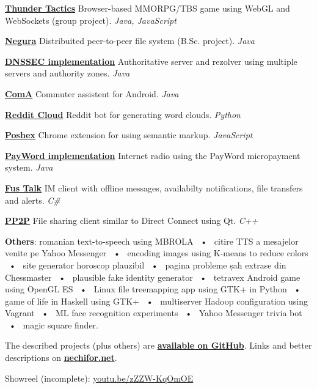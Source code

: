 \documentclass[a4wide]{article}
\newcommand{\uses}[1]{\emph{\color[rgb]{0.35, 0.35, 0.35} #1}}
\newcommand{\sep}{~•~}
\newcommand{\longDesc}[4]{\href{#4}{\bf #1} #3 \uses{#2}}
\begin{document}
\longDesc{Thunder Tactics}{Java, JavaScript}{Browser-based MMORPG/TBS game using
WebGL and WebSockets (group project).}{https://github.com/paul-nechifor/tt}

\longDesc{Negura}{Java}{Distribuited peer-to-peer file system (B.Sc.
project).}{https://github.com/paul-nechifor/negura}

\longDesc{DNSSEC implementation}{Java}{Authoritative server and rezolver using
multiple servers and authority
zones.}{https://github.com/paul-nechifor/dnssec-toy}

\longDesc{ComA}{Java}{Commuter assistent for
Android.}{https://github.com/paul-nechifor/coma}

\longDesc{Reddit Cloud}{Python}{Reddit bot for generating word
clouds.}{https://github.com/paul-nechifor/reddit-cloud}

\longDesc{Poshex}{JavaScript}{Chrome extension for using semantic
markup.}{https://github.com/paul-nechifor/poshex}

\longDesc{PayWord implementation}{Java}{Internet radio using the PayWord
micropayment system. }{https://github.com/paul-nechifor/payword-radio}

\longDesc{Fus Talk}{C\#}{IM client with offline messages, availabilty
notifications, file transfers and
alerts.}{https://github.com/paul-nechifor/fus-talk}

\longDesc{PP2P}{C++}{File sharing client similar to Direct Connect using
Qt.}{https://github.com/paul-nechifor/pp2p}

\vspace{5mm}

\textbf{Others}: romanian text-to-speech using MBROLA
\sep{} citire TTS a mesajelor venite pe Yahoo Messenger
\sep{} encoding images using K-means to reduce colors
\sep{} site generator horoscop plauzibil
\sep{} pagina probleme șah extrase din Chessmaster
\sep{} plausible fake identity generator
\sep{} tetravex Android game using OpenGL ES
\sep{} Linux file treemapping app using GTK+ in Python
\sep{} game of life in Haskell using GTK+
\sep{} multiserver Hadoop configuration using Vagrant
\sep{} ML face recognition experiments
\sep{} Yahoo Messenger trivia bot
\sep{} magic square finder.

\vspace{5mm}

The described projects (plus others) are
\href{http://github.com/paul-nechifor}{\textbf{available on GitHub}}. Links and
better descriptions on \href{http://nechifor.net}{\textbf{nechifor.net}}.

\vspace{5mm}

Showreel (incomplete): \href{http://youtu.be/zZZW-KqOmOE}{youtu.be/zZZW-KqOmOE}
\end{document}
